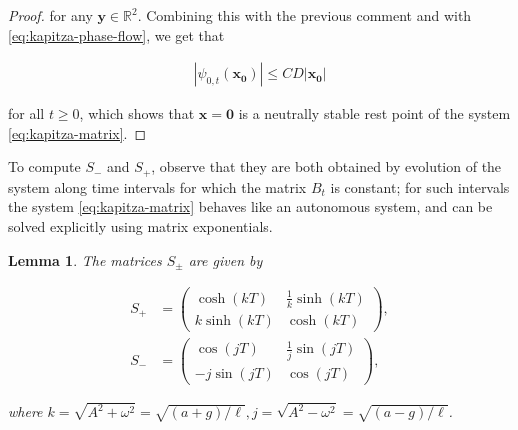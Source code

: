 \documentclass[11pt]{report}
\newcommand{\R}{\mathbb{R}}
\theoremstyle{plain}
\newtheorem{lem}[thm]{Lemma}
\theoremstyle{definition}
\begin{document}
\begin{proof}
\noindent for any $\mathbf{y}\in\R^2$. Combining this with the
previous comment and with \eqref{eq:kapitza-phase-flow},
we get that

\begin{align*}
|\psi_{0,t} (\mathbf{x_0})| \le CD |\mathbf{x_0}|
\end{align*}

\noindent for all $t\ge 0$, which shows that
$\mathbf{x}=\mathbf{0}$ is a neutrally stable rest
point of the system \eqref{eq:kapitza-matrix}.
\end{proof}

\noindent To compute $S_-$ and $S_+$, observe that they are both
obtained by evolution of the system along time
intervals for which the matrix $B_t$ is constant; for
such intervals the system \eqref{eq:kapitza-matrix}
behaves like an autonomous system, and can be solved
explicitly using matrix exponentials.

\begin{lem}
The matrices $S_\pm$ are given by

\begin{equation*} \tag{42}\label{eq:kapitza-mat-exp}
\begin{split}
S_+ &= \left(\begin{array}{cc}
\cosh\left(kT\right) & \frac{1}{k}\sinh\left(kT\right)
\\[5pt]
k\sinh\left(kT\right) & \cosh\left(kT\right)
\end{array}\right),
\\[3pt]
S_- &= \left(\begin{array}{cc}
\cos\left(jT\right) & \frac{1}{j}\sin\left(jT\right)
\\[5pt]
-j\sin\left(jT\right) & \cos\left(jT\right)
\end{array}\right),
\end{split}
\end{equation*}

\noindent where
$k=\sqrt{A^2+\omega^2}=\sqrt{(a+g)/\ell},
j=\sqrt{A^2-\omega^2}=\sqrt{(a-g)/\ell}$.
\end{lem}
\end{document}
